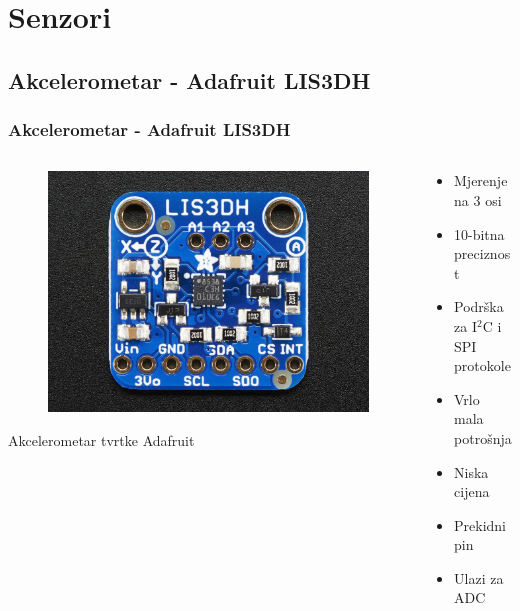 \documentclass[12pt]{beamer}
\begin{document}
\section{Senzori}
\subsection{Akcelerometar - Adafruit LIS3DH}
\begin{frame}
	\frametitle{Akcelerometar - Adafruit LIS3DH}
	\begin{columns}[T]
	    \begin{column}{.5\textwidth}
		\begin{figure}[h]
			\begin{minipage}{\textwidth}
				\centering
				\includegraphics[width=\linewidth]{slike/lis3dh.jpg}
			\end{minipage}
		\end{figure}
		Akcelerometar tvrtke Adafruit
		\end{column}

		\begin{column}{.5\textwidth}
			\begin{itemize}
				\item Mjerenje na 3 osi
				\item 10-bitna preciznost
				\item Podrška za I$^2$C i SPI protokole
				\item Vrlo mala potrošnja
				\item Niska cijena
			\end{itemize}
			\begin{itemize}
				\item Prekidni pin
				\item Ulazi za ADC
			\end{itemize}
		\end{column}
	\end{columns}
\end{frame}
\end{document}
